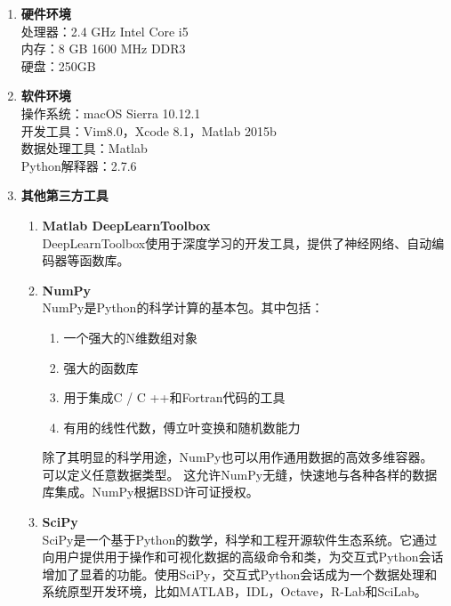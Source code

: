 \begin{enumerate}
    \item \textbf{硬件环境} \\
    处理器：2.4 GHz Intel Core i5 \\
    内存：8 GB 1600 MHz DDR3 \\
    硬盘：250GB 
    \item \textbf{软件环境} \\
    操作系统：macOS Sierra 10.12.1 \\
    开发工具：Vim8.0，Xcode 8.1，Matlab 2015b \\
    数据处理工具：Matlab \\
    Python解释器：2.7.6
    \item \textbf{其他第三方工具} 
    \begin{enumerate}
        \item \textbf{Matlab DeepLearnToolbox} \\
        DeepLearnToolbox\cite{IMM2012-06284}使用于深度学习的开发工具，提供了神经网络、自动编码器等函数库。
        \item \textbf{NumPy} \\ NumPy是Python的科学计算的基本包。其中包括：
        \begin{enumerate}
            \item 一个强大的N维数组对象
            \item 强大的函数库
            \item 用于集成C / C ++和Fortran代码的工具
            \item 有用的线性代数，傅立叶变换和随机数能力  
        \end{enumerate}
        除了其明显的科学用途，NumPy也可以用作通用数据的高效多维容器。 可以定义任意数据类型。 这允许NumPy无缝，快速地与各种各样的数据库集成。NumPy根据BSD许可证授权。
        \item \textbf{SciPy} \\ SciPy是一个基于Python的数学，科学和工程开源软件生态系统。它通过向用户提供用于操作和可视化数据的高级命令和类，为交互式Python会话增加了显着的功能。使用SciPy，交互式Python会话成为一个数据处理和系统原型开发环境，比如MATLAB，IDL，Octave，R-Lab和SciLab。
        

\end{enumerate}
\end{enumerate}
